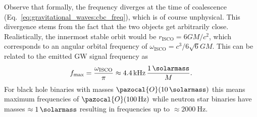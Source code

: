 Observe that formally, the frequency diverges at the time of coalescence (Eq.~\ref{eq:gravitational_waves:cbc_freq}), which is of course unphysical. This divergence stems from the fact that the two objects get arbitrarily close. Realistically, the innermost stable orbit would be $r_\text{ISCO} = 6GM/c^2$, which corresponds to an angular orbital frequency of $\omega_\text{ISCO} = c^3/6\sqrt{6} GM$. This can be related to the emitted GW signal frequency as
\begin{equation}
	\label{eq:theory_of_gravitational_waves:max_freq_approx}
	f_\text{max} = \frac{\omega_\text{ISCO}}{\pi} 
	\approx \SI{4.4}{\kilo\hertz}\,\frac{\SI{1}{\solarmass}}{M}.
\end{equation}
For black hole binaries with masses $\pazocal{O}(\SI{10}{\solarmass})$ this means maximum frequencies of $\pazocal{O}(\SI{100}{\hertz})$ while neutron star binaries have masses $\approx\SI{1}{\solarmass}$ resulting in frequencies up to $\approx\SI{2000}{\hertz}$.
